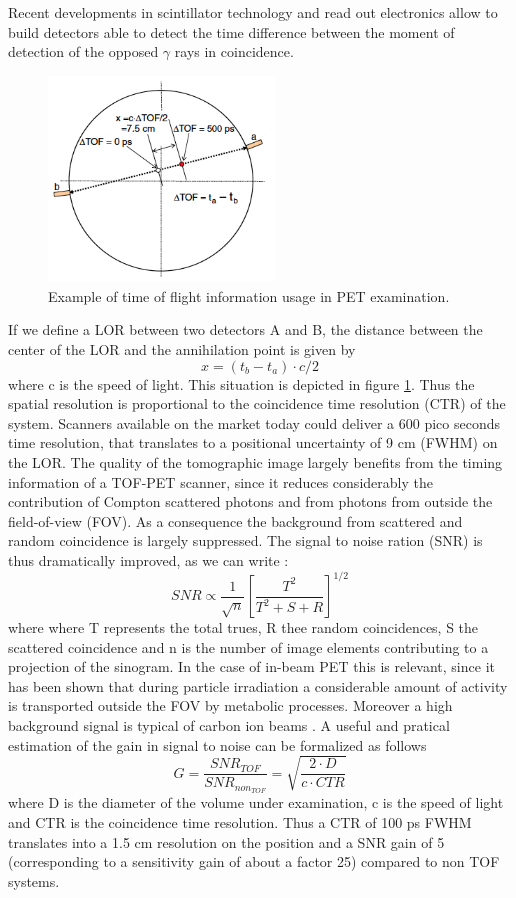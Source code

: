 Recent developments in scintillator technology and read out electronics allow to build detectors able to detect the time difference between the moment of detection of the opposed $\gamma$ rays in coincidence. 
\begin{figure}
\centering  
\includegraphics[width=6cm]{Pictures/Chapter_1/TOF}
\caption[TOF-PET schematics]{Example of time of flight information usage in PET examination.}
\label{fig:TOF}
\end{figure}
If we define a LOR between two detectors A and B, the distance between the center of the LOR and the annihilation point is given by
\begin{equation}
x = (t_{b}-t_{a} ) \cdot c/2
\end{equation}
where c is the speed of light. This situation is depicted in figure \ref{fig:TOF}.
Thus the spatial resolution is proportional to the coincidence time resolution (CTR) of the system.
Scanners available on the market today could deliver a 600 pico seconds time resolution, that translates to a positional uncertainty of 9 cm (FWHM) on the LOR.
The quality of the tomographic image largely benefits from the timing information of a TOF-PET scanner, since it reduces considerably  the contribution of Compton scattered photons and from photons from outside the field-of-view (FOV).
As a consequence the background from scattered and random coincidence is largely suppressed. 
The signal to noise ration (SNR) is thus dramatically improved, as we can write \cite{Karp2008}:
\begin{equation}
SNR \propto \frac{1}{\sqrt{n}}\left[ \frac{T^{2}}{T^{2} + S + R} \right]^{1/2}
\end{equation}
where where T represents the total trues, R thee random coincidences, S the scattered coincidence and n is the number of image elements contributing to a projection of the sinogram.
In the case of in-beam PET this is relevant, since it has been shown \cite{Fiedler2006} that during particle irradiation a considerable amount of activity is transported outside the FOV by metabolic processes. Moreover a high background signal is typical of carbon ion beams \cite{Enghardt2004}. 
A useful and pratical estimation of the gain in signal to noise can be formalized as follows
\begin{displaymath}
G = \frac{SNR_{TOF}}{SNR_{non_{TOF}}} = \sqrt{\frac{2\cdot D}{c \cdot CTR}}
\end{displaymath}
where D is the diameter of the volume under examination, c is the speed of light and CTR is the coincidence time resolution. Thus a CTR of 100 ps FWHM translates into a 1.5 cm resolution on the position and a SNR gain of 5 (corresponding to a sensitivity gain of about a factor 25) compared to non TOF systems.

